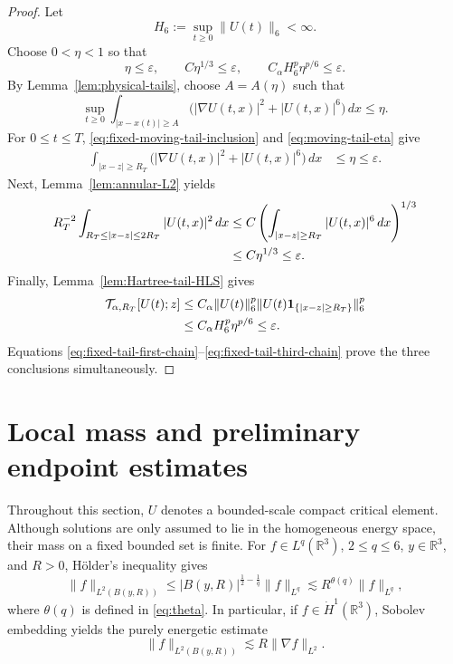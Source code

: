 \documentclass[preprint,12pt]{elsarticle}
\numberwithin{equation}{section}
\theoremstyle{remark}
\newcommand{\R}{\mathbb R}
\newcommand{\dd}{\,d}
\newcommand{\Ttail}[1]{\mathcal T_{\alpha,#1}}
\newcommand{\one}{\mathbf 1}
\begin{document}
\begin{proof}
Let
\begin{equation*}
  H_6:=\sup_{t\ge0}\|U(t)\|_6<\infty.
\end{equation*}
Choose $0<\eta<1$ so that
\begin{equation*}
  \eta\le\varepsilon,
  \qquad
  C\eta^{1/3}\le\varepsilon,
  \qquad
  C_\alpha H_6^p\eta^{p/6}\le\varepsilon.
\end{equation*}
By Lemma~\ref{lem:physical-tails}, choose $A=A(\eta)$ such that
\begin{equation}\label{eq:moving-tail-eta}
  \sup_{t\ge0}
  \int_{|x-x(t)|\ge A}
  \bigl(|\nabla U(t,x)|^2+|U(t,x)|^6\bigr)\dd x
  \le\eta.
\end{equation}
For $0\le t\le T$, \eqref{eq:fixed-moving-tail-inclusion} and \eqref{eq:moving-tail-eta} give
\begin{align}
  \int_{|x-z|\ge R_T}
  \bigl(|\nabla U(t,x)|^2+|U(t,x)|^6\bigr)\dd x
  &\le\eta\le\varepsilon.
  \label{eq:fixed-tail-first-chain}
\end{align}
Next, Lemma~\ref{lem:annular-L2} yields
\begin{align*}
  R_T^{-2}
  \int_{R_T\le|x-z|\le2R_T}|U(t,x)|^2\dd x
  &\le C
  \left(\int_{|x-z|\ge R_T}|U(t,x)|^6\dd x\right)^{1/3}\notag\\
  &\le C\eta^{1/3}\le\varepsilon.
\end{align*}
Finally, Lemma~\ref{lem:Hartree-tail-HLS} gives
\begin{align}
  \Ttail{R_T}[U(t);z]
  &\le C_\alpha\|U(t)\|_6^p
  \|U(t)\one_{\{|x-z|\ge R_T\}}\|_6^p\notag\\
  &\le C_\alpha H_6^p\eta^{p/6}
  \le\varepsilon.
  \label{eq:fixed-tail-third-chain}
\end{align}
Equations \eqref{eq:fixed-tail-first-chain}--\eqref{eq:fixed-tail-third-chain} prove the three conclusions simultaneously.
\end{proof}

\section{Local mass and preliminary endpoint estimates}

Throughout this section, $U$ denotes a bounded-scale compact critical element. Although solutions are only assumed to lie in the homogeneous energy space, their mass on a fixed bounded set is finite. For $f\in L^q(\R^3)$, $2\le q\le6$, $y\in\R^3$, and $R>0$, H\"older's inequality gives
\begin{equation}\label{eq:local-L2-Lq}
  \|f\|_{L^2(B(y,R))}
  \le |B(y,R)|^{\frac12-\frac1q}\|f\|_{L^q}
  \lesssim R^{\theta(q)}\|f\|_{L^q},
\end{equation}
where $\theta(q)$ is defined in \eqref{eq:theta}. In particular, if $f\in\dot H^1(\R^3)$, Sobolev embedding yields the purely energetic estimate
\begin{equation}\label{eq:local-L2-energy}
  \|f\|_{L^2(B(y,R))}
  \lesssim R\|\nabla f\|_{L^2}.
\end{equation}
\end{document}
